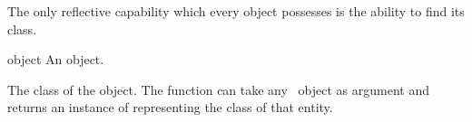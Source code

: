 %
\begin{optDefinition}
\noindent
The only reflective capability which every object possesses is the ability to
find its class.

%
\begin{arguments}
    \item[object] An object.
\end{arguments}
%
\result%
The class of the object.
%
\remarks%
The function  can take any \lisp\ object as argument and
returns an instance of  representing the class of that entity.
%
%
\end{optDefinition}


